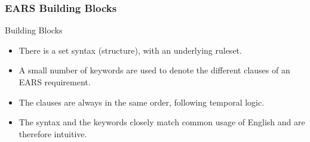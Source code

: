 \documentclass[aspectratio=169]{beamer}
\begin{document}
%
\begin{frame}
 \frametitle{EARS Building Blocks}
 \begin{block}{Building Blocks}
  \begin{itemize}
    \item There is a set syntax (structure), with an underlying ruleset. 
    \item A small number of keywords are used to denote the different clauses of an EARS requirement. 
    \item The clauses are always in the same order, following temporal logic. 
    \item The syntax and the keywords closely match common usage of English and are therefore intuitive.
  \end{itemize}  
 \end{block}
\end{frame}
%
\end{document}
